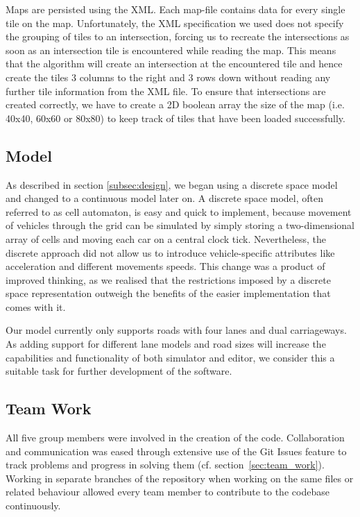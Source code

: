 Maps are persisted using the XML. Each map-file contains data for every single tile on the map. Unfortunately, the XML specification we used does not specify the grouping of tiles to an intersection, forcing us to recreate the intersections as soon as an intersection tile is encountered while reading the map. This means that the algorithm will create an intersection at the encountered tile and hence create the tiles 3 columns to the right and 3 rows down without reading any further tile information from the XML file. To ensure that intersections are created correctly, we have to create a 2D boolean array the size of the map (i.e. 40x40, 60x60 or 80x80) to keep track of tiles that have been loaded successfully. 

\subsection*{Model}
As described in section \ref{subsec:design}, we began using a discrete space model and changed to a continuous model later on. A discrete space model, often referred to as cell automaton, is easy and quick to implement, because movement of vehicles through the grid can be simulated by simply storing a two-dimensional array of cells and moving each car on a central clock tick. Nevertheless, the discrete approach did not allow us to introduce vehicle-specific attributes like acceleration and different movements speeds.
 This change was a product of improved thinking, as we realised that the restrictions imposed by a discrete space representation outweigh the benefits of the easier implementation that comes with it.

Our model currently only supports roads with four lanes and dual carriageways. As adding support for different lane models and road sizes will increase the capabilities and functionality of both simulator and editor, we consider this a suitable task for further development of the software.

\subsection*{Team Work}
All five group members were involved in the creation of the code. Collaboration and communication was eased through extensive use of the Git Issues feature to track problems and progress in solving them (cf. section~\ref{sec:team_work}). Working in separate branches of the repository when working on the same files or related behaviour allowed every team member to contribute to the codebase continuously.  

